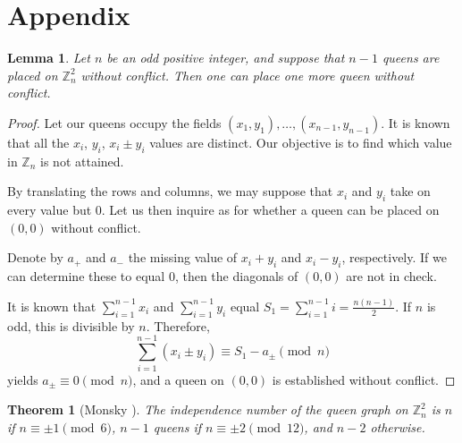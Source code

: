 \documentclass[11pt]{article}
\newtheorem{theorem}[problem]{Theorem}
\newtheorem{lemma}[problem]{Lemma}
\begin{document}
\section*{Appendix}

\begin{lemma}
Let $n$ be an odd positive integer, and suppose that $n-1$ queens are placed on $\mathbb{Z}_n^2$ without conflict. Then one can place one more queen without conflict.
\end{lemma}

\begin{proof}
Let our queens occupy the fields $(x_1,y_1),\dots,(x_{n-1},y_{n-1})$. It is known that all the $x_i$, $y_i$, $x_i\pm y_i$ values are distinct. Our objective is to find which value in $\mathbb{Z}_n$ is not attained.

By translating the rows and columns, we may suppose that $x_i$ and $y_i$ take on every value but $0$. Let us then inquire as for whether a queen can be placed on $(0,0)$ without conflict. 

Denote by $a_+$ and $a_-$ the missing value of $x_i+y_i$ and $x_i-y_i$, respectively. If we can determine these to equal $0$, then the diagonals of $(0,0)$ are not in check.

It is known that $\sum_{i=1}^{n-1}x_i$ and $\sum_{i=1}^{n-1}y_i$ equal $S_1=\sum_{i=1}^{n-1}i=\frac{n(n-1)}{2}$. If $n$ is odd, this is divisible by $n$. Therefore,
$$\sum_{i=1}^{n-1}(x_i\pm y_i)\equiv S_1-a_\pm\pmod n$$
yields $a_\pm \equiv 0\pmod n$, and a queen on $(0,0)$ is established without conflict.
\end{proof}

\begin{theorem}[Monsky \cite{Mon}] \label{mon}
The independence number of the queen graph on $\mathbb{Z}_n^2$ is $n$ if $n\equiv \pm 1 \pmod 6$, $n-1$ queens if $n\equiv \pm 2\pmod {12}$, and $n-2$ otherwise.
\end{theorem}
\end{document}
